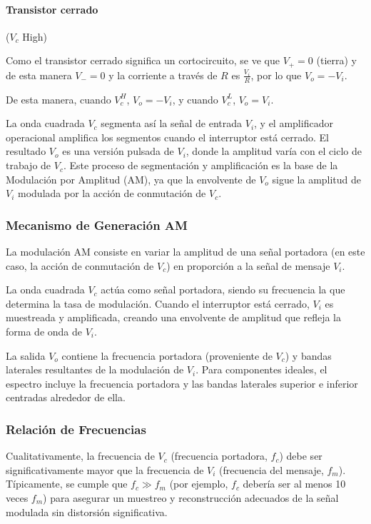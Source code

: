 \paragraph{Transistor cerrado} ($V_c$ High)

Como el transistor cerrado significa un cortocircuito, se ve que $V_+ = 0$ (tierra) y de esta manera $V_- = 0$ y la corriente a través de $R$ es $\frac{V_i}{R}$, por lo que $V_o = -V_i$.

De esta manera, cuando $V_c^H$, $V_o = -V_i$, y cuando $V_c^L$, $V_o = V_i$.

La onda cuadrada $V_c$ segmenta así la señal de entrada $V_i$, y el amplificador operacional amplifica los segmentos cuando el interruptor está cerrado. El resultado $V_o$ es una versión pulsada de $V_i$, donde la amplitud varía con el ciclo de trabajo de $V_c$. Este proceso de segmentación y amplificación es la base de la Modulación por Amplitud (AM), ya que la envolvente de $V_o$ sigue la amplitud de $V_i$ modulada por la acción de conmutación de $V_c$.

\subsubsection{Mecanismo de Generación AM}

La modulación AM consiste en variar la amplitud de una señal portadora (en este caso, la acción de conmutación de $V_c$) en proporción a la señal de mensaje $V_i$.

La onda cuadrada $V_c$ actúa como señal portadora, siendo su frecuencia la que determina la tasa de modulación. Cuando el interruptor está cerrado, $V_i$ es muestreada y amplificada, creando una envolvente de amplitud que refleja la forma de onda de $V_i$.

La salida $V_o$ contiene la frecuencia portadora (proveniente de $V_c$) y bandas laterales resultantes de la modulación de $V_i$. Para componentes ideales, el espectro incluye la frecuencia portadora y las bandas laterales superior e inferior centradas alrededor de ella.

\subsubsection{Relación de Frecuencias}

Cualitativamente, la frecuencia de $V_c$ (frecuencia portadora, $f_c$) debe ser significativamente mayor que la frecuencia de $V_i$ (frecuencia del mensaje, $f_m$). Típicamente, se cumple que $f_c \gg f_m$ (por ejemplo, $f_c$ debería ser al menos 10 veces $f_m$) para asegurar un muestreo y reconstrucción adecuados de la señal modulada sin distorsión significativa.

